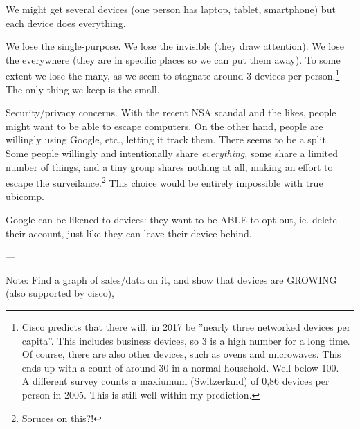 We might get several devices (one person has laptop, tablet, smartphone) but each device does everything.

We lose the single-purpose. We lose the invisible (they draw attention). We lose the everywhere (they are in specific places
so we can put them away). To some extent we lose the many, as we seem to stagnate around 3 devices per person.\footnote{Cisco
predicts that there will, in 2017 be ''nearly three networked devices per capita''. This includes business devices, so 3 is a
high number for a long time.\cite{cisco} Of course, there are also other devices, such as ovens and microwaves. This ends up
with a count of around 30 in a normal household. Well below 100. --- A different survey counts a maxiumum (Switzerland) of
0,86 devices per person in 2005. This is still well within my prediction.\cite{nationmaster}} The only thing we keep is the small.

Security/privacy concerns. With the recent NSA scandal and the likes, people might want to be able to escape computers.
On the other hand, people are willingly using Google, etc., letting it track them. There seems to be a split. Some people
willingly and intentionally share \emph{everything}, some share a limited number of things, and a tiny group shares nothing
at all, making an effort to escape the surveilance.\footnote{Soruces on this?!} This choice would be entirely impossible
with true ubicomp.

Google can be likened to devices: they want to be ABLE to opt-out, ie. delete their account, just like they can leave their device behind.

---

Note: Find a graph of sales/data on it, and show that devices are GROWING (also supported by cisco),